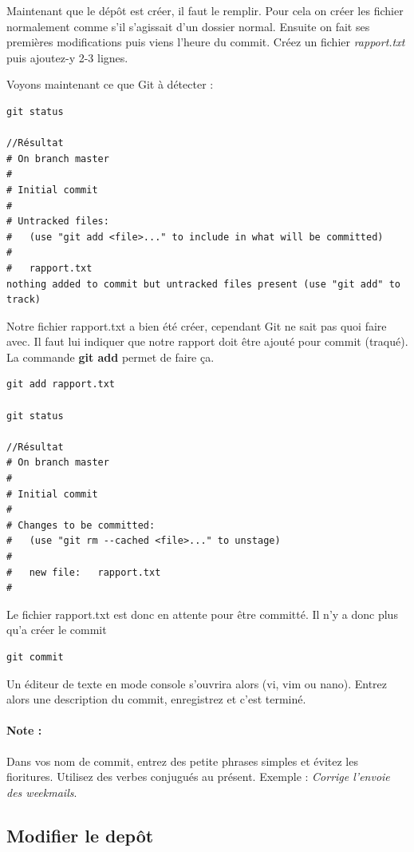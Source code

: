 \documentclass[a4paper]{article}
\begin{document}
Maintenant que le dépôt est créer, il faut le remplir. Pour cela on créer les fichier normalement comme s'il s'agissait d'un dossier normal. Ensuite on fait ses premières modifications puis viens l'heure du commit. Créez un fichier \emph{rapport.txt} puis ajoutez-y 2-3 lignes.

Voyons maintenant ce que Git à détecter :

\begin{verbatim}
git status

//Résultat
# On branch master
#
# Initial commit
#
# Untracked files:
#   (use "git add <file>..." to include in what will be committed)
#
#	rapport.txt
nothing added to commit but untracked files present (use "git add" to track)
\end{verbatim}

Notre fichier rapport.txt a bien été créer, cependant Git ne sait pas quoi faire avec. Il faut lui indiquer que notre rapport doit être ajouté pour commit (traqué). La commande \textbf{git add} permet de faire ça.

\begin{verbatim}
git add rapport.txt

git status

//Résultat
# On branch master
#
# Initial commit
#
# Changes to be committed:
#   (use "git rm --cached <file>..." to unstage)
#
#	new file:   rapport.txt
#
\end{verbatim}

Le fichier rapport.txt est donc en attente pour être committé. Il n'y a donc plus qu'a créer le commit

\begin{verbatim}
git commit
\end{verbatim}

Un éditeur de texte en mode console s'ouvrira alors (vi, vim ou nano). Entrez alors une description du commit, enregistrez et c'est terminé.

\paragraph{Note :}Dans vos nom de commit, entrez des petite phrases simples et évitez les fioritures. Utilisez des verbes conjugués au présent. Exemple : \textit{Corrige l'envoie des weekmails}.

\subsection{Modifier le dep\^ot}
\end{document}
